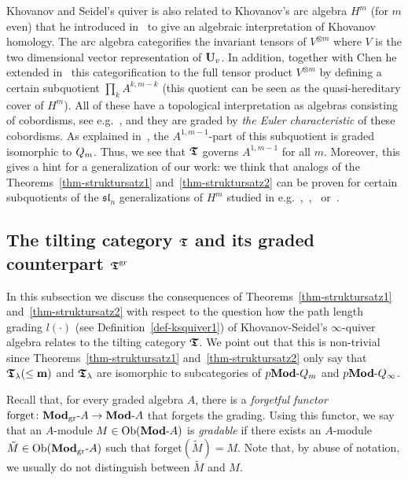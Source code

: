 \begin{rem}\label{rem-webalg}
Khovanov and Seidel's quiver is also 
related to Khovanov's arc algebra 
$H^m$ (for $m$ even) that he introduced 
in~\cite{kh4} to give an algebraic interpretation 
of Khovanov homology. The arc algebra categorifies the 
invariant tensors of $V^{\otimes m}$ where $V$ is the 
two dimensional vector representation of $\boldsymbol{\mathrm{U}}_v$.
In addition, together with Chen he extended in~\cite{chkh} 
this categorification to the full tensor 
product $V^{\otimes m}$ by defining a certain 
subquotient $\prod_k A^{k,m-k}$ (this quotient can 
be seen as the quasi-hereditary cover of $H^m$). 
All of these have a topological interpretation 
as algebras consisting of cobordisms, 
see e.g.~\cite[Section~2]{chkh}, and they are 
graded by \textit{the Euler characteristic} of these cobordisms.
As explained in~\cite[Section~3]{chkh}, 
the $A^{1,m-1}$-part of this subquotient is graded 
isomorphic to $Q_{m}$. Thus, we see that $\boldsymbol{\mathfrak{T}}$ governs $A^{1,m-1}$ for all $m$.
Moreover, this gives a hint for a  
generalization of our work: we think 
that analogs of the Theorems~\ref{thm-struktursatz1} and~\ref{thm-struktursatz2} 
can be proven for certain subquotients of the $\mathfrak{sl}_n$ 
generalizations of $H^m$ studied in e.g.~\cite{mack1},~\cite{mpt},~\cite{tub3} or~\cite{tub4}.
\end{rem}




\subsection{The tilting category \texorpdfstring{$\boldsymbol{\mathfrak{T}}$}{T} and its graded counterpart \texorpdfstring{$\boldsymbol{\mathfrak{T}}^{\mathrm{gr}}$}{Tgr}}\label{sub-grad}
In this subsection we discuss the 
consequences of Theorems~\ref{thm-struktursatz1} 
and~\ref{thm-struktursatz2} with respect to the 
question how the path length grading $l(\cdot)$ 
(see Definition~\ref{def-ksquiver1}) of 
Khovanov-Seidel's $\infty$-quiver algebra relates 
to the tilting category $\boldsymbol{\mathfrak{T}}$. We point out that this is non-trivial since Theorems~\ref{thm-struktursatz1} and~\ref{thm-struktursatz2} only say that 
$\boldsymbol{\mathfrak{T}}_{\lambda}(\leq \boldsymbol{\mathrm{m}})$ and $\boldsymbol{\mathfrak{T}}_{\lambda}$ are 
isomorphic to subcategories of $p\boldsymbol{\mathrm{Mod}}\text{-}Q_m$ and $p\boldsymbol{\mathrm{Mod}}\text{-}Q_{\infty}$.



Recall that, for every graded algebra $A$, there is a 
\textit{forgetful functor} 
$\mathrm{forget}\colon\boldsymbol{\mathrm{Mod}}_{\mathrm{gr}}\text{-}A\to\boldsymbol{\mathrm{Mod}}\text{-}A$ 
that forgets 
the grading. Using this 
functor, we say that an $A$-module 
$M\in\mathrm{Ob}(\boldsymbol{\mathrm{Mod}}\text{-}A)$ is \textit{gradable} if there 
exists an $A$-module $\tilde M\in\mathrm{Ob}(\boldsymbol{\mathrm{Mod}}_{\mathrm{gr}}\text{-}A)$ 
such that $\mathrm{forget}(\tilde M)=M$. Note 
that, by abuse of notation, we usually do not distinguish between $\tilde M$ and $M$.




